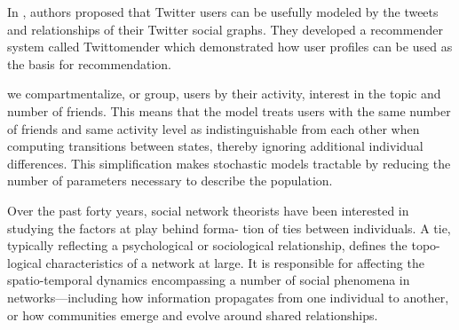 \documentclass[twocolumn]{svjour3}          %
\begin{document}
In \cite{hannon2010recommending}, authors proposed that Twitter users can be usefully modeled by the tweets and relationships of their Twitter social graphs. They developed a recommender system called Twittomender which demonstrated how user profiles can be used as the basis for recommendation.

we compartmentalize, or group, users by their activity, interest in the topic and number of friends. This means that the model treats users with the same number of friends and same activity level as indistinguishable from each other when computing transitions between states, thereby ignoring additional individual differences. This simplification makes stochastic models tractable by reducing the number of parameters necessary to describe the population.

Over the past forty years, social network theorists have
been interested in studying the factors at play behind forma- tion of ties between individuals. A tie, typically reflecting a psychological or sociological relationship, defines the topo- logical characteristics of a network at large. It is responsible for affecting the spatio-temporal dynamics encompassing a number of social phenomena in networks—including how information propagates from one individual to another, or how communities emerge and evolve around shared relationships.
\end{document}
